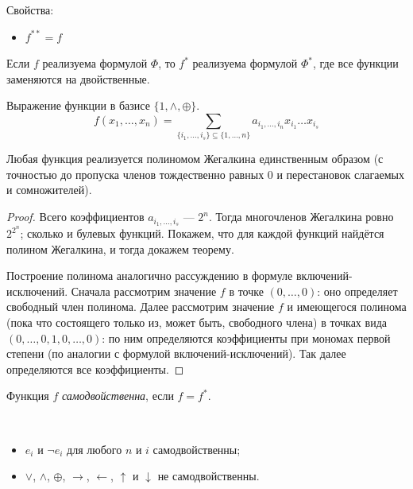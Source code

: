 \documentclass[12pt,a4paper]{article}
\begin{document}
    Свойства:
    \begin{itemize}
        \item $f^{**} = f$
    \end{itemize}

    \begin{statement}
        Если $f$ реализуема формулой $\Phi$, то $f^*$ реализуема формулой $\Phi^*$, где все функции заменяются на двойственные.
    \end{statement}

    \begin{definition}
        Выражение функции в базисе $\{1, \wedge, \oplus\}$.
        \[
            f(x_1, \dots, x_n) = \sum_{\{i_1, \dots, i_s\}\subseteq\{1, \dots, n\}} a_{i_1, \dots, i_n} x_{i_1} \dots x_{i_s}
        \]
    \end{definition}

    \begin{theorem}[Жегалкин]
        Любая функция реализуется полиномом Жегалкина единственным образом (с точностью до пропуска членов тождественно равных 0 и перестановок слагаемых и сомножителей). 
    \end{theorem}

    \begin{proof}
        Всего коэффициентов $a_{i_1, \dots, i_s}$ --- $2^n$. Тогда многочленов Жегалкина ровно $2^{2^n}$; сколько и булевых функций. Покажем, что для каждой функций найдётся полином Жегалкина, и тогда докажем теорему.

        Построение полинома аналогично рассуждению в формуле включений-исключений. Сначала рассмотрим значение $f$ в точке $(0, \dots, 0)$: оно определяет свободный член полинома. Далее рассмотрим значение $f$ и имеющегося полинома (пока что состоящего только из, может быть, свободного члена) в точках вида $(0, \dots, 0, 1, 0, \dots, 0)$: по ним определяются коэффициенты при мономах первой степени (по аналогии с формулой включений-исключений). Так далее определяются все коэффициенты.
    \end{proof}

    \begin{definition}
        Функция $f$ \emph{самодвойственна}, если $f=f^*$.
    \end{definition}

    \begin{example}\ 
        \begin{itemize}
            \item $e_i$ и $\neg e_i$ для любого $n$ и $i$ самодвойственны;
            \item $\vee$, $\wedge$, $\oplus$, $\rightarrow$, $\leftarrow$, $\uparrow$ и $\downarrow$ не самодвойственны.
        \end{itemize}
    \end{example}
\end{document}
